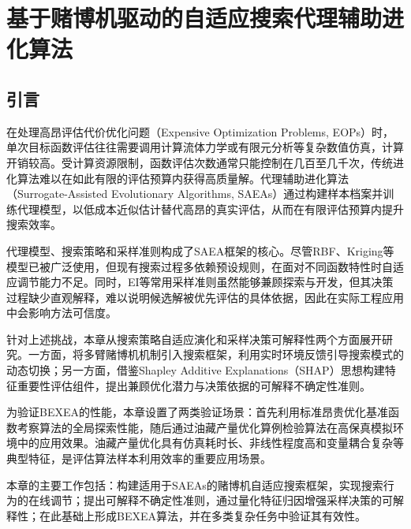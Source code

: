 \chapter{基于赌博机驱动的自适应搜索代理辅助进化算法}
\label{chap:bexea}

\section{引言}
在处理高昂评估代价优化问题（Expensive Optimization Problems, EOPs）时，单次目标函数评估往往需要调用计算流体力学或有限元分析等复杂数值仿真，计算开销较高\cite{liu2023airfoils,kumar2024optimization}。受计算资源限制，函数评估次数通常只能控制在几百至几千次，传统进化算法难以在如此有限的评估预算内获得高质量解\cite{he2023review}。代理辅助进化算法（Surrogate-Assisted Evolutionary Algorithms, SAEAs）通过构建样本档案并训练代理模型，以低成本近似估计替代高昂的真实评估，从而在有限评估预算内提升搜索效率\cite{kudela2022recent,jin2018data}。

代理模型、搜索策略和采样准则构成了SAEA框架的核心。尽管RBF、Kriging等模型已被广泛使用\cite{regis2013evolutionary,sun2017surrogate,buche2005accelerating,liu2013gaussian,loshchilov2010comparison,guo2018heterogeneous,zhou2005study,chavez2016polynomial}，但现有搜索过程多依赖预设规则\cite{khaldi2024surrogate,stanovov2023surrogate,mallipeddi2015evolving,lv2023multi,yu2025surrogate,li2020surrogate,lin2024surrogate}，在面对不同函数特性时自适应调节能力不足。同时，EI等常用采样准则虽然能够兼顾探索与开发\cite{mockus1994application,jones1998efficient}，但其决策过程缺少直观解释，难以说明候选解被优先评估的具体依据，因此在实际工程应用中会影响方法可信度。

针对上述挑战，本章从搜索策略自适应演化和采样决策可解释性两个方面展开研究。一方面，将多臂赌博机机制引入搜索框架，利用实时环境反馈引导搜索模式的动态切换\cite{slivkins2019introduction}；另一方面，借鉴Shapley Additive Explanations（SHAP）思想\cite{nohara2022explanation}构建特征重要性评估组件，提出兼顾优化潜力与决策依据的可解释不确定性准则。

为验证BEXEA的性能，本章设置了两类验证场景：首先利用标准昂贵优化基准函数考察算法的全局探索性能，随后通过油藏产量优化算例检验算法在高保真模拟环境中的应用效果。油藏产量优化具有仿真耗时长、非线性程度高和变量耦合复杂等典型特征，是评估算法样本利用效率的重要应用场景。

本章的主要工作包括：构建适用于SAEAs的赌博机自适应搜索框架，实现搜索行为的在线调节；提出可解释不确定性准则，通过量化特征归因增强采样决策的可解释性；在此基础上形成BEXEA算法，并在多类复杂任务中验证其有效性。

